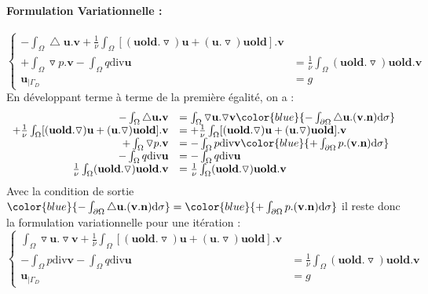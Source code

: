 \documentclass{book}
\begin{document}
\paragraph{Formulation Variationnelle :}
\[
\left\{
\begin{array}{rl}
-\int_{\Omega} \bigtriangleup \textbf{u.v} + 
\frac{1}{\nu}\int_{\Omega} [( \textbf{uold}. \triangledown) \textbf{u}+ (\textbf{u} .\triangledown) \textbf{uold}].\textbf{v}  &\\
+\int_{\Omega} \triangledown p.\textbf{v}
-\int_{\Omega} q\text{div}\textbf{u} &=
\frac{1}{\nu}\int_{\Omega}(\textbf{uold}.\triangledown)\textbf{uold}.\textbf{v} \\
\textbf{u}_{|\Gamma_D}  &=g
\end{array}\right.
\]
En développant terme à terme de la première égalité, on a :
\[
\begin{array}{rl}

-\int_{\Omega} \bigtriangleup \textbf{u.v} &=\int_{\Omega} \triangledown \textbf{u}.\triangledown \textbf{v}\color{blue}{-\int_{\partial\Omega} \bigtriangleup \textbf{u}.(\textbf{v}.\textbf{n})\text{d}\sigma}\\
 
+\frac{1}{\nu}\int_{\Omega} [( \textbf{uold}. \triangledown) \textbf{u}+ (\textbf{u} .\triangledown) \textbf{uold}].\textbf{v} &=+\frac{1}{\nu}\int_{\Omega} [( \textbf{uold}. \triangledown) \textbf{u}+ (\textbf{u} .\triangledown) \textbf{uold}].\textbf{v} \\

+\int_{\Omega} \triangledown p.\textbf{v} &=-\int_{\Omega} p\text{div}\textbf{v}\color{blue}{+\int_{\partial\Omega} p.(\textbf{v}.\textbf{n})\text{d}\sigma}\\
 
-\int_{\Omega} q\text{div}\textbf{u} &=-\int_{\Omega} q\text{div}\textbf{u}\\

\frac{1}{\nu}\int_{\Omega}(\textbf{uold}.\triangledown)\textbf{uold}.\textbf{v}&=\frac{1}{\nu}\int_{\Omega}(\textbf{uold}.\triangledown)\textbf{uold}.\textbf{v} 
\end{array}
\]
Avec la condition de sortie $\color{blue}{-\int_{\partial\Omega} \bigtriangleup \textbf{u}.(\textbf{v}.\textbf{n})\text{d}\sigma}=\color{blue}{+\int_{\partial\Omega} p.(\textbf{v}.\textbf{n})\text{d}\sigma}$ il reste donc la formulation variationnelle pour une itération : 
\[
\left\{
\begin{array}{rl}
\int_{\Omega} \triangledown \textbf{u}.\triangledown \textbf{v}
+\frac{1}{\nu}\int_{\Omega} [( \textbf{uold}. \triangledown) \textbf{u}+ (\textbf{u} .\triangledown) \textbf{uold}].\textbf{v} &\\ 

-\int_{\Omega} p\text{div}\textbf{v}
 
-\int_{\Omega} q\text{div}\textbf{u} &=

 \frac{1}{\nu}\int_{\Omega}(\textbf{uold}.\triangledown)\textbf{uold}.\textbf{v}\\
\textbf{u}_{|\Gamma_D}  &=g 
\end{array}
\right.
\]
\end{document}
